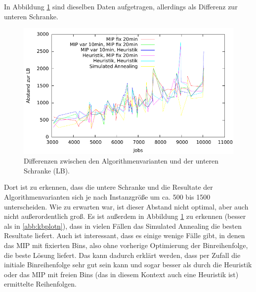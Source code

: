 \documentclass{scrreprt}
\begin{document}
In Abbildung \ref{abb:kbplotabsn} sind dieselben Daten aufgetragen, allerdings als Differenz zur unteren Schranke.
\begin{figure}
    \begin{center}
        \includegraphics[width=.8\textwidth]{../prog/binpacking/results/kbplotabsn.pdf}
    \end{center}
    \caption{
        \label{abb:kbplotabsn}
        Differenzen zwischen den Algorithmenvarianten und der unteren Schranke (LB).
    }
\end{figure}
Dort ist zu erkennen, dass die untere Schranke und die Resultate der Algorithmenvarianten sich je nach Instanzgröße um ca. 500 bis 1500 unterscheiden.
Wie zu erwarten war, ist dieser Abstand nicht optimal, aber auch nicht außerordentlich groß.
Es ist außerdem in Abbildung \ref{abb:kbplotabsn} zu erkennen (besser als in \ref{abb:kbplotn}), dass in vielen Fällen das Simulated Annealing die besten Resultate liefert.
Auch ist interessant, dass es einige wenige Fälle gibt, in denen das MIP mit fixierten Bins, also ohne vorherige Optimierung der Binreihenfolge, die beste Lösung liefert.
Das kann dadurch erklärt werden, dass per Zufall die initiale Binreihenfolge sehr gut sein kann und sogar besser als durch die Heuristik oder das MIP mit freien Bins 
(das in diesem Kontext auch eine Heuristik ist) ermittelte Reihenfolgen.
\end{document}
